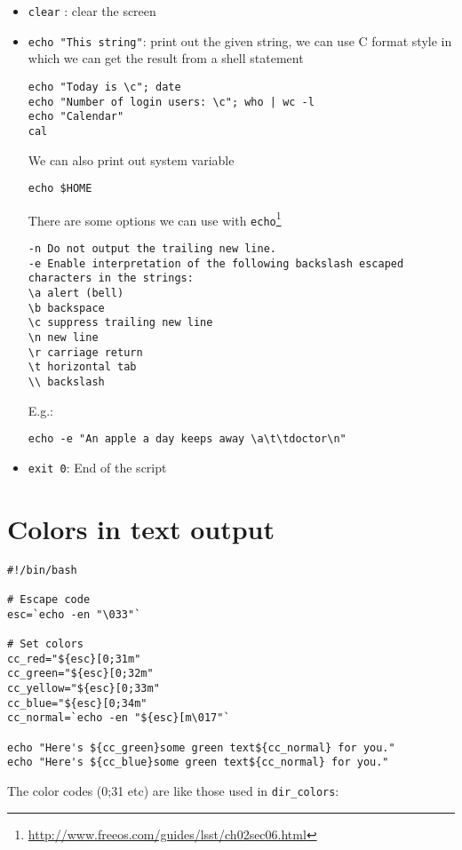\begin{itemize}
\item \verb!clear! : clear the screen
\item \verb!echo "This string"!: print out the given string, we can
  use C format style in which we can get the result from a shell statement
\begin{verbatim}
echo "Today is \c"; date
echo "Number of login users: \c"; who | wc -l
echo "Calendar"
cal
\end{verbatim}
We can also print out system variable
\begin{verbatim}
echo $HOME
\end{verbatim}

There are some options we can use with \verb!echo!\footnote{\url{http://www.freeos.com/guides/lsst/ch02sec06.html}}
\begin{verbatim}
-n Do not output the trailing new line.
-e Enable interpretation of the following backslash escaped characters in the strings:
\a alert (bell)
\b backspace
\c suppress trailing new line
\n new line
\r carriage return
\t horizontal tab
\\ backslash
\end{verbatim}

E.g.:
\begin{verbatim}
echo -e "An apple a day keeps away \a\t\tdoctor\n"
\end{verbatim}



\item \verb!exit 0!: End of the script


\end{itemize}

\section{Colors in text output}


\begin{verbatim}
#!/bin/bash

# Escape code
esc=`echo -en "\033"`

# Set colors
cc_red="${esc}[0;31m"
cc_green="${esc}[0;32m"
cc_yellow="${esc}[0;33m"
cc_blue="${esc}[0;34m"
cc_normal=`echo -en "${esc}[m\017"`

echo "Here's ${cc_green}some green text${cc_normal} for you."
echo "Here's ${cc_blue}some green text${cc_normal} for you."
\end{verbatim}

The color codes (0;31 etc) are like those used in \verb!dir_colors!:

